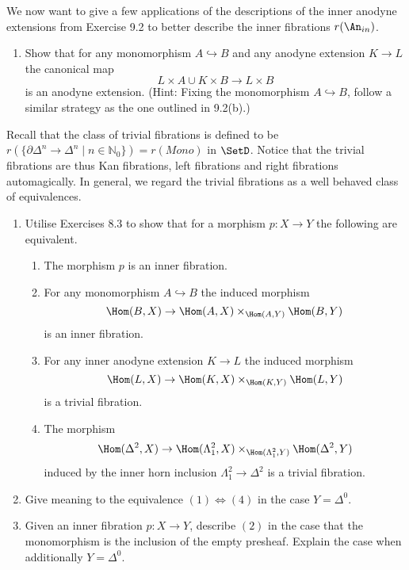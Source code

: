 \begin{Exercise}
	We now want to give a few applications of the descriptions of the inner anodyne extensions from Exercise 9.2 to better describe the inner fibrations $ r ( \An_{ in } ) $.
	\begin{enumerate}[label=(\alph*)]
		\item 
		Show that for any monomorphism $ A \hookrightarrow B $ and any anodyne extension $ K \to L $ the canonical map 
		\[
		L \times A \cup K \times B \to L \times B 
		\]
		is an anodyne extension.
		\newline
		(Hint: Fixing the monomorphism $ A \hookrightarrow B $, follow a similar strategy as the one outlined in 9.2(b).)
	\end{enumerate}
	
	Recall that the class of trivial fibrations is defined to be $ r ( \{ \partial \Delta^n \to \Delta^n \mid n \in \mathbb{ N }_0 \} ) = r ( Mono ) $ in $ \SetD $.
	Notice that the trivial fibrations are thus Kan fibrations, left fibrations and right fibrations automagically.
	In general, we regard the trivial fibrations as a well behaved class of equivalences.
	
	\begin{enumerate}[label=(\alph*)]
		\item 
		Utilise Exercises 8.3 to show that for a morphism $ p \colon X \to Y $ the following are equivalent.
		
		\begin{enumerate}
			\item 
			The morphism $ p $ is an inner fibration.
			
			\item 
			For any monomorphism $ A \hookrightarrow B $ the induced morphism
			\[
			\Hom ( B , X ) \to \Hom ( A , X ) \times_{ \Hom ( A , Y ) } \Hom ( B , Y ) 
			\]
			is an inner fibration.
			
			\item 
			For any inner anodyne extension $ K \to L $ the induced morphism
			\[
			\Hom ( L , X  ) \to \Hom ( K , X ) \times_{ \Hom ( K , Y ) } \Hom ( L , Y ) 
			\]
			is a trivial fibration.
			
			\item 
			The morphism 
			\[
			\Hom ( \Delta^2 , X ) \to \Hom ( \Lambda_1^2 , X ) \times_{ \Hom ( \Lambda_1^2 , Y 	) } \Hom ( \Delta^2 , Y )
			\]
			induced by the inner horn inclusion $ \Lambda_1^2 \to \Delta^2 $ is a trivial fibration.
		\end{enumerate}
		
		\item 
		Give meaning to the equivalence $ ( 1 ) \iff ( 4 ) $ in the case $ Y = \Delta^0 $.
		
		\item 
		Given an inner fibration $ p \colon X \to Y $, describe $ ( 2 ) $ in the case that the monomorphism is the inclusion of the empty presheaf.
		Explain the case when additionally $ Y = \Delta^0 $.
	\end{enumerate}
\end{Exercise}    

